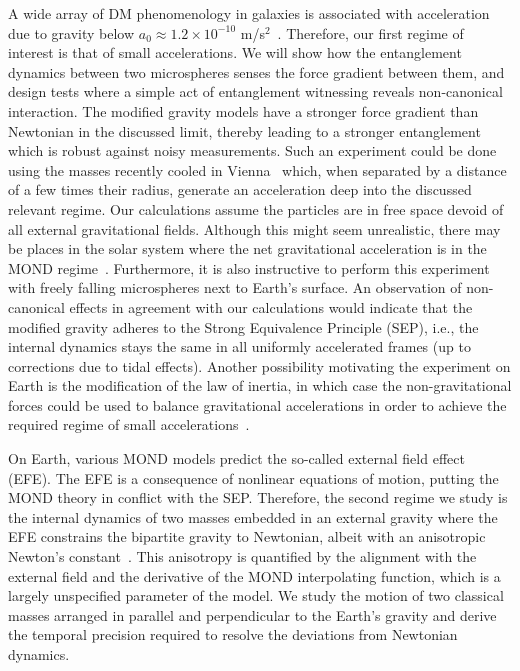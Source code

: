 \documentclass[aps,prl,reprint,superscriptaddress,nofootinbib,floatfix]{revtex4-2}
\begin{document}
A wide array of DM phenomenology in galaxies is associated with acceleration due to gravity below $a_0 \approx 1.2 \times 10^{-10}$ m/s$^2$~\cite{MOND-Milogram1983,MONDinMilkyWay-Famaey2005,MOND-Gentile2011}. Therefore, our first regime of interest is that of small accelerations. 
We will show how the entanglement dynamics between two microspheres senses the force gradient between them, and design tests where a simple act of entanglement witnessing reveals non-canonical interaction. 
The modified gravity models have a stronger force gradient than Newtonian in the discussed limit, thereby leading to a stronger entanglement which is robust against noisy measurements.
Such an experiment could be done using the masses recently cooled in Vienna~\cite{Sciene-Aspelmeyer2020} which, when separated by a distance of a few times their radius, generate an acceleration deep into the discussed relevant regime.
Our calculations assume the particles are in free space devoid of all external gravitational fields.
Although this might seem unrealistic, there may be places in the solar system where the net gravitational acceleration is in the MOND regime~\cite{MOND-Bekenstein2006,MOND-LISA-Magueijo2012}.
Furthermore, it is also instructive to perform this experiment with freely falling microspheres next to Earth's surface. 
An observation of non-canonical effects in agreement with our calculations would indicate that the modified gravity adheres to the Strong Equivalence Principle (SEP), i.e., the internal dynamics stays the same in all uniformly accelerated frames (up to corrections due to tidal effects).
Another possibility motivating the experiment on Earth is the modification of the law of inertia, in which case the non-gravitational forces could be used to balance gravitational accelerations in order to achieve the required regime of small accelerations~\cite{MOND-Ignatiev2007,MOND-Ignatiev2015,MOND-Ignatiev2009,ModGrav-TorsionPend-Timberlake2021}.

On Earth, various MOND models predict the so-called external field effect (EFE).
The EFE is a consequence of nonlinear equations of motion, putting the MOND theory in conflict with the SEP. 
Therefore, the second regime we study is the internal dynamics of two masses embedded in an external gravity where the EFE constrains the bipartite gravity to Newtonian, albeit with an anisotropic Newton's constant~\cite{EFE-Blanchet2011}.
This anisotropy is quantified by the alignment with the external field and the derivative of the MOND interpolating function, which is a largely unspecified parameter of the model.
We study the motion of two classical masses arranged in parallel and perpendicular to the Earth's gravity and derive the temporal precision required to resolve the deviations from Newtonian dynamics.
\end{document}
